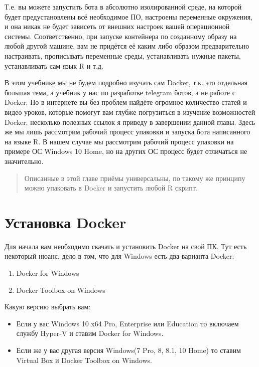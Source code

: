 \documentclass[
]{book}
\providecommand{\tightlist}{%
  \setlength{\itemsep}{0pt}\setlength{\parskip}{0pt}}
\begin{document}
Т.е. вы можете запустить бота в абсолютно изолированной среде, на которой будет предустановлены всё необходимое ПО, настроены переменные окружения, и она никак не будет зависеть от внешних настроек вашей операционной системы. Соответственно, при запуске контейнера по созданному образу на любой другой машине, вам не придётся её каким либо образом предварительно настраивать, прописывать переменные среды, устанавливать нужные пакеты, устанавливать сам язык R и т.д.

В этом учебнике мы не будем подробно изучать сам Docker, т.к. это отдельная большая тема, а учебник у нас по разработке telegram ботов, а не работе с Docker. Но в интернете вы без проблем найдёте огромное количество статей и видео уроков, которые помогут вам глубже погрузиться в изучение возможностей Docker, несколько полезных ссылок я приведу в завершении данной главы. Здесь же мы лишь рассмотрим рабочий процесс упаковки и запуска бота написанного на языке R. В нашем случае мы рассмотрим рабочий процесс упаковки на примере ОС Windows 10 Home, но на других ОС процесс будет отличаться не значительно.

\begin{quote}
Описанные в этой главе приёмы универсальны, по такому же принципу можно упаковать в Docker и запустить любой R скрипт.
\end{quote}

\section{Установка Docker}\label{ux443ux441ux442ux430ux43dux43eux432ux43aux430-docker}

Для начала вам необходимо скачать и установить Docker на свой ПК. Тут есть некоторый нюанс, дело в том, что для Windows есть два варианта Docker:

\begin{enumerate}
\def\labelenumi{\arabic{enumi}.}
\tightlist
\item
  Docker for Windows
\item
  Docker Toolbox on Windows
\end{enumerate}

Какую версию выбрать вам:

\begin{itemize}
\tightlist
\item
  Если у вас Windows 10 x64 Pro, Enterprise или Education то включаем службу Hyper-V и ставим Docker for Windows.
\item
  Если же у вас другая версия Windows(7 Pro, 8, 8.1, 10 Home) то ставим Virtual Box и Docker Toolbox on Windows.
\end{itemize}
\end{document}
